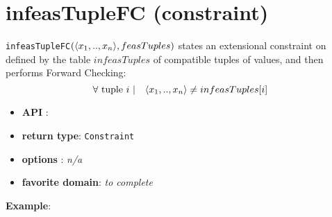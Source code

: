 \label{infeastuplefc}
\hypertarget{infeastuplefc}{}

\section{infeasTupleFC (constraint)}\label{infeastuplefc:infeastuplefcconstraint}\hypertarget{infeastuplefc:infeastuplefcconstraint}{}
\begin{notedef}
  \texttt{infeasTupleFC}$(\langle x_1,..,x_n\rangle,feasTuples)$ states an extensional constraint on  defined by the table $infeasTuples$ of compatible tuples of values, and then performs Forward Checking:
      $$\forall \text{ tuple } i\ |\quad \langle x_1,..,x_n\rangle\neq infeasTuples[i]$$
\end{notedef}

\begin{itemize}
	\item \textbf{API} : 
	\item \textbf{return type}: \texttt{Constraint}
	\item \textbf{options} : \emph{n/a}
	\item \textbf{favorite domain}: \emph{to complete}
\end{itemize}

\textbf{Example}:

